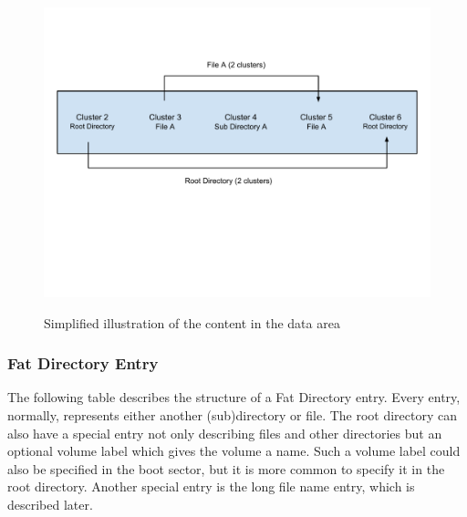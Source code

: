 \begin{figure}[h!]
\caption{Simplified illustration of the content in the data area}
\centering
\includegraphics[scale=0.62]{figures/fat_data_area}
\label{figure:data_area}
\end{figure}

\subsubsection{Fat Directory Entry}

The following table describes the structure of a Fat Directory entry. Every entry, normally, represents either another (sub)directory or file. The root directory can also have a special entry not only describing files and other directories but an optional volume label which gives the volume a name. Such a volume label could also be specified in the boot sector, but it is more common to specify it in the root directory. Another special entry is the long file name entry, which is described later.

